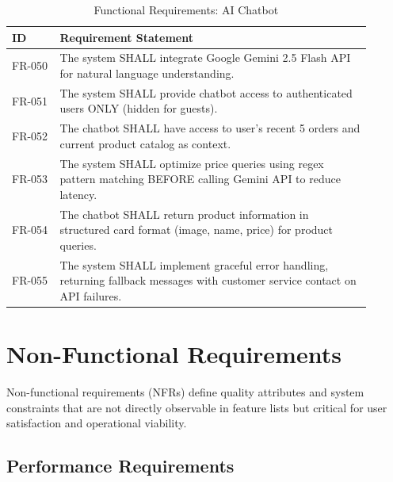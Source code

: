 \begin{table}[H]
\centering
\caption{Functional Requirements: AI Chatbot}
\label{tab:fr_chatbot}
\small
\begin{tabular}{@{}p{0.12\linewidth}p{0.78\linewidth}@{}}
\toprule
\textbf{ID} & \textbf{Requirement Statement} \\
\midrule
FR-050 & The system SHALL integrate Google Gemini 2.5 Flash API for natural language understanding. \\
FR-051 & The system SHALL provide chatbot access to authenticated users ONLY (hidden for guests). \\
FR-052 & The chatbot SHALL have access to user's recent 5 orders and current product catalog as context. \\
FR-053 & The system SHALL optimize price queries using regex pattern matching BEFORE calling Gemini API to reduce latency. \\
FR-054 & The chatbot SHALL return product information in structured card format (image, name, price) for product queries. \\
FR-055 & The system SHALL implement graceful error handling, returning fallback messages with customer service contact on API failures. \\
\bottomrule
\end{tabular}
\end{table}

\section{Non-Functional Requirements}

Non-functional requirements (NFRs) define quality attributes and system constraints that are not directly observable in feature lists but critical for user satisfaction and operational viability.

\subsection{Performance Requirements}

